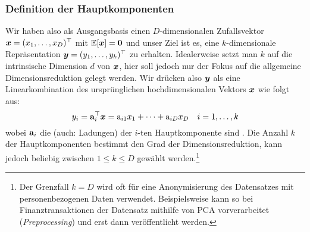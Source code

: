 \subsubsection{Definition der Hauptkomponenten}
\label{ch:MethodenDerDimRed:traditionell:PCA:Definition}
Wir haben also als Ausgangsbasis einen $D$-dimensionalen Zufallsvektor $\bm{x} = (x_1, \ldots, x_D)^\top$ mit $\operatorname{\mathbb{E}}[\bm{x}] = \mathbf{0}$ und unser Ziel ist es, eine $k$-dimensionale Repräsentation $\bm{y} = (y_1,\ldots,y_k)^\top$ zu erhalten. Idealerweise setzt man $k$ auf die intrinsische Dimension $d$ von $\bm{x}$, hier soll jedoch nur der Fokus auf die allgemeine Dimensionsreduktion gelegt werden. Wir drücken also $\bm{y}$ als eine Linearkombination des ursprünglichen hochdimensionalen Vektors $\bm{x}$ wie folgt aus:
\begin{equation}
	y_i = \mathbf{a}_i^\top \bm{x} = \textnormal{a}_{i1} x_1 + \cdots + \textnormal{a}_{iD} x_D
	\quad i = 1,\ldots,k
\end{equation}
wobei $\mathbf{a}_i$ die  (auch: Ladungen) der $i$-ten Hauptkomponente sind \parencite[vgl.][2]{Jolliffe.2002}. Die Anzahl $k$ der Hauptkomponenten bestimmt den Grad der Dimensionsreduktion, kann jedoch beliebig zwischen $1 \leq k \leq D$ gewählt werden.\footnote{Der Grenzfall $k = D$ wird oft für eine Anonymisierung des Datensatzes mit personenbezogenen Daten verwendet. Beispielsweise kann so bei Finanztransaktionen der Datensatz mithilfe von PCA vorverarbeitet (\textit{Preprocessing}) und erst dann veröffentlicht werden.}

